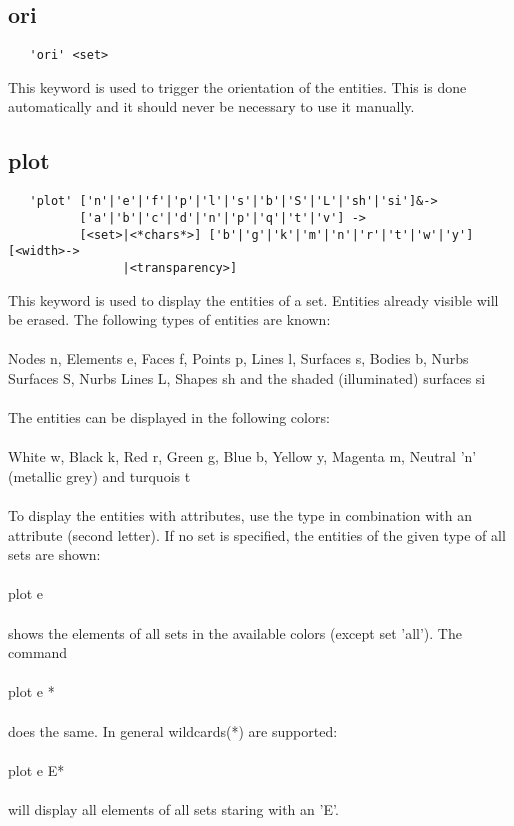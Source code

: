 \documentclass{article}
\begin{document}
\subsection{\label{ori}ori}
\begin{verbatim}
   'ori' <set> 
\end{verbatim}
This keyword is used to trigger the orientation of the entities. This is done automatically and it should never be necessary to use it manually.

\subsection{\label{plot}plot}
\begin{verbatim}
   'plot' ['n'|'e'|'f'|'p'|'l'|'s'|'b'|'S'|'L'|'sh'|'si']&->
          ['a'|'b'|'c'|'d'|'n'|'p'|'q'|'t'|'v'] ->
          [<set>|<*chars*>] ['b'|'g'|'k'|'m'|'n'|'r'|'t'|'w'|'y'] [<width>->
                |<transparency>] 
\end{verbatim}
This keyword is used to display the entities of a set. Entities already visible will be erased. The following types of entities are known:\\\\
Nodes n, Elements e, Faces f, Points p, Lines l, Surfaces s, Bodies b, Nurbs Surfaces S, Nurbs Lines L, Shapes sh and the shaded (illuminated) surfaces si\\\\The entities can be displayed in the following colors:\\\\
White w, Black k, Red r, Green g, Blue b, Yellow y, Magenta m, Neutral 'n' (metallic grey) and turquois t\\\\ To display the entities with attributes, use the type in combination with an attribute (second letter). If no set is specified, the entities of the given type of all sets are shown:\\\\plot e\\\\shows the elements of all sets in the available colors (except set 'all'). The command \\\\plot e *\\\\does the same. In general wildcards(*) are supported:\\\\plot e E*\\\\will display all elements of all sets staring with an 'E'.
\end{document}
